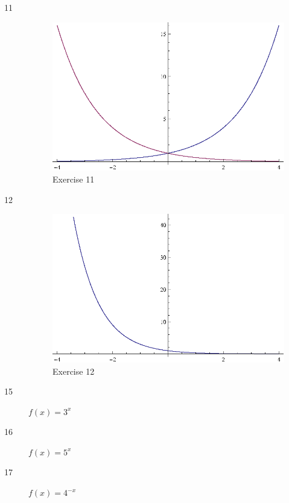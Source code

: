\documentclass{exam}
\begin{document}
  \begin{description}

    \item[11] 
      \begin{figure}[H]
        \centering
        \includegraphics[scale=1.0]{exercise11.eps}
        \caption*{Exercise 11}
      \end{figure}

    \item[12] 
      \begin{figure}[H]
        \centering
        \includegraphics[scale=1.0]{exercise12.eps}
        \caption*{Exercise 12}
      \end{figure}

    \item[15] $f(x) = 3^x$

    \item[16] $f(x) = 5^x$

    \item[17] $f(x) = 4^{-x}$


\end{description}
\end{document}
